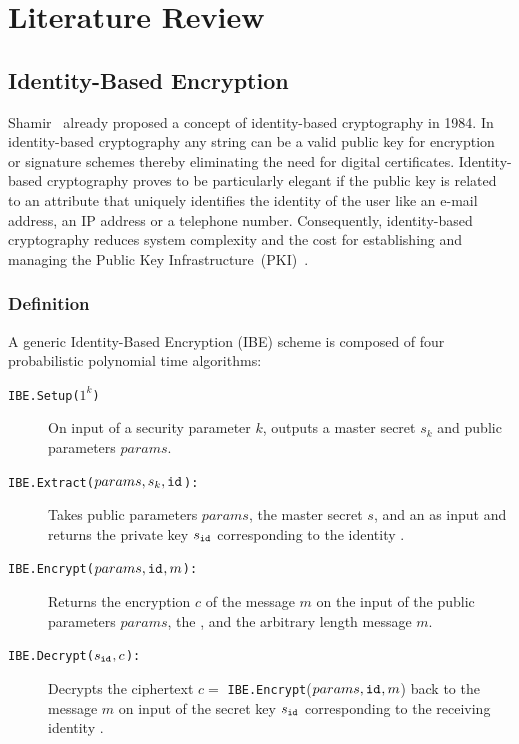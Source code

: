\chapter{Literature Review}
\label{cha:2}

\section{Identity-Based Encryption}
Shamir~\cite{art:Shamir84} already proposed a concept of identity-based cryptography in 1984. In identity-based cryptography any string can be a valid public key for encryption or signature schemes thereby eliminating the need for digital certificates. Identity-based cryptography proves to be particularly elegant if the public key is related to an attribute that uniquely identifies the identity of the user like an e-mail address, an IP address or a telephone number. Consequently, identity-based cryptography reduces system complexity and the cost for establishing and managing the Public Key Infrastructure~(PKI)~\cite{art:BaekNSS04}. 


\subsection{Definition}
A generic Identity-Based Encryption (IBE) scheme is composed of four probabilistic polynomial time algorithms:
\begin{description}
    \item[\texttt{IBE.Setup($1^k$)}] On input of a security parameter $k$, outputs a master secret $s_k$ and public parameters $params$.
    \item[\texttt{IBE.Extract($params, s_k, \mathtt{id}_{}$):}] Takes public parameters $params$, the master secret $s$, and an \id{} as input and returns the private key $s_{\mathtt{id}_{}}$ corresponding to the identity \id{}.
    \item[\texttt{IBE.Encrypt($params, \mathtt{id}_{}, m$):}] Returns the encryption $c$ of the message $m$ on the input of the public parameters $params$, the \id{}, and the arbitrary length message $m$.
    \item[\texttt{IBE.Decrypt($s_{\mathtt{id}_{}}, c$):}] Decrypts the ciphertext $c =$ \texttt{IBE.Encrypt}($params, \mathtt{id}_{}, m$) back to the message $m$ on input of the secret key $s_{\mathtt{id}_{}}$ corresponding to the receiving identity \id{}.
\end{description}

